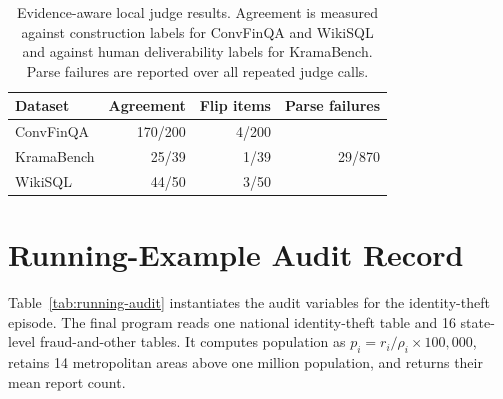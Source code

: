 \begin{table}[t]
\centering
\caption{Evidence-aware local judge results. Agreement is measured
against construction labels for ConvFinQA and WikiSQL and against
human deliverability labels for KramaBench. Parse failures are
reported over all repeated judge calls.}
\label{tab:app-judge}
\scriptsize
\setlength{\tabcolsep}{3pt}
\begin{tabular}{@{}lrrr@{}}
\toprule
Dataset & Agreement & Flip items & Parse failures \\
\midrule
ConvFinQA & 170/200 & 4/200 & \multirow{3}{*}{29/870} \\
KramaBench & 25/39 & 1/39 & \\
WikiSQL & 44/50 & 3/50 & \\
\bottomrule
\end{tabular}
\end{table}

\section{Running-Example Audit Record}
\label{app:running}

Table~\ref{tab:running-audit} instantiates the audit variables for
the identity-theft episode. The final program reads one national
identity-theft table and 16 state-level fraud-and-other tables. It
computes population as $p_i=r_i/\rho_i\times100{,}000$, retains 14
metropolitan areas above one million population, and returns their
mean report count.

